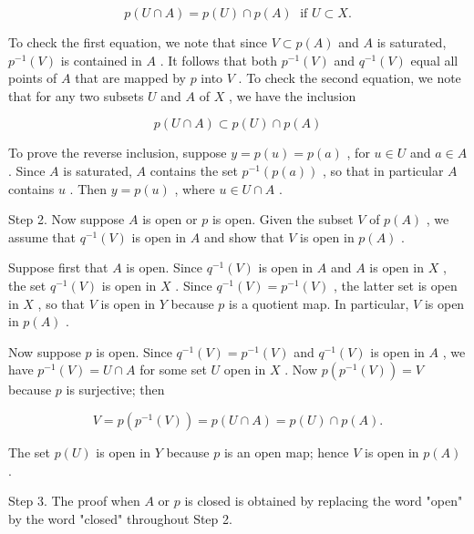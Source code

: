 \documentclass[10pt]{article}
\begin{document}
\[
p\left( {U \cap  A}\right)  = p\left( U\right)  \cap  p\left( A\right) \;\text{ if }U \subset  X.
\]

To check the first equation, we note that since \(V \subset  p\left( A\right)\) and \(A\) is saturated, \({p}^{-1}\left( V\right)\) is contained in \(A\) . It follows that both \({p}^{-1}\left( V\right)\) and \({q}^{-1}\left( V\right)\) equal all points of \(A\) that are mapped by \(p\) into \(V\) . To check the second equation, we note that for any two subsets \(U\) and \(A\) of \(X\) , we have the inclusion

\[
p\left( {U \cap  A}\right)  \subset  p\left( U\right)  \cap  p\left( A\right)
\]

To prove the reverse inclusion, suppose \(y = p\left( u\right)  = p\left( a\right)\) , for \(u \in  U\) and \(a \in  A\) . Since \(A\) is saturated, \(A\) contains the set \({p}^{-1}\left( {p\left( a\right) }\right)\) , so that in particular \(A\) contains \(u\) . Then \(y = p\left( u\right)\) , where \(u \in  U \cap  A\) .

Step 2. Now suppose \(A\) is open or \(p\) is open. Given the subset \(V\) of \(p\left( A\right)\) , we assume that \({q}^{-1}\left( V\right)\) is open in \(A\) and show that \(V\) is open in \(p\left( A\right)\) .

Suppose first that \(A\) is open. Since \({q}^{-1}\left( V\right)\) is open in \(A\) and \(A\) is open in \(X\) , the set \({q}^{-1}\left( V\right)\) is open in \(X\) . Since \({q}^{-1}\left( V\right)  = {p}^{-1}\left( V\right)\) , the latter set is open in \(X\) , so that \(V\) is open in \(Y\) because \(p\) is a quotient map. In particular, \(V\) is open in \(p\left( A\right)\) .

Now suppose \(p\) is open. Since \({q}^{-1}\left( V\right)  = {p}^{-1}\left( V\right)\) and \({q}^{-1}\left( V\right)\) is open in \(A\) , we have \({p}^{-1}\left( V\right)  = U \cap  A\) for some set \(U\) open in \(X\) . Now \(p\left( {{p}^{-1}\left( V\right) }\right)  = V\) because \(p\) is surjective; then

\[
V = p\left( {{p}^{-1}\left( V\right) }\right)  = p\left( {U \cap  A}\right)  = p\left( U\right)  \cap  p\left( A\right) .
\]

The set \(p\left( U\right)\) is open in \(Y\) because \(p\) is an open map; hence \(V\) is open in \(p\left( A\right)\) .

Step 3. The proof when \(A\) or \(p\) is closed is obtained by replacing the word "open" by the word "closed" throughout Step 2.
\end{document}
